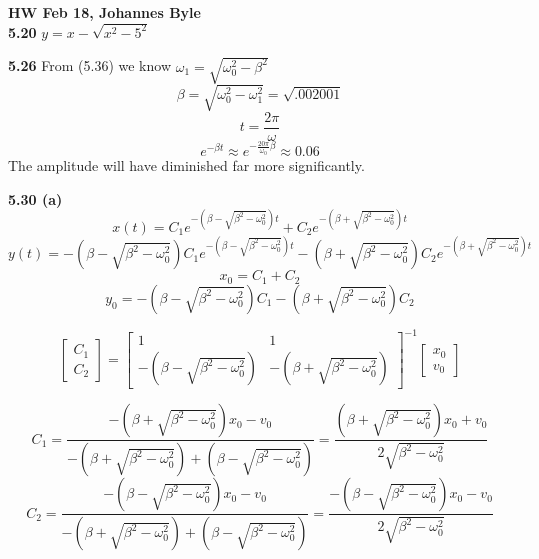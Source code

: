 \documentclass[english]{article}
\begin{document}
\textbf{HW Feb 18, Johannes Byle}\\

\noindent
\textbf{5.20} $y=x-\sqrt{x^2-5^2}$


\noindent
\textbf{5.26} From (5.36) we know $\omega_1=\sqrt{\omega_0^2-\beta^2}$
$$\beta=\sqrt{\omega_0^2-\omega_1^2}=\sqrt{.002001}$$
$$t=\frac{2\pi}{\omega}$$
$$e^{-\beta t}\approx e^{-\frac{20\pi}{\omega_0}\beta}\approx0.06$$
The amplitude will have diminished far more significantly.

\noindent
\textbf{5.30 (a)} $$x(t)=C_1e^{-(\beta-\sqrt{\beta^2-\omega_0^2})t}+C_2e^{-(\beta+\sqrt{\beta^2-\omega_0^2})t}$$
$$y(t)=-(\beta-\sqrt{\beta^2-\omega_0^2})C_1e^{-(\beta-\sqrt{\beta^2-\omega_0^2})t}-(\beta+\sqrt{\beta^2-\omega_0^2})C_2e^{-(\beta+\sqrt{\beta^2-\omega_0^2})t}$$
$$x_0=C_1+C_2$$
$$y_0=-(\beta-\sqrt{\beta^2-\omega_0^2})C_1-(\beta+\sqrt{\beta^2-\omega_0^2})C_2$$

\[
\begin{bmatrix}
C_1 \\
C_2
\end{bmatrix}
=
\begin{bmatrix}
1&1 \\
-(\beta-\sqrt{\beta^2-\omega_0^2})&-(\beta+\sqrt{\beta^2-\omega_0^2})
\end{bmatrix}^{-1}
\begin{bmatrix}
x_0 \\
v_0
\end{bmatrix}
\]

$$C_1=\frac{-(\beta+\sqrt{\beta^2-\omega_0^2})x_0-v_0}{-(\beta+\sqrt{\beta^2-\omega_0^2})+(\beta-\sqrt{\beta^2-\omega_0^2})}=\frac{(\beta+\sqrt{\beta^2-\omega_0^2})x_0+v_0}{2\sqrt{\beta^2-\omega_0^2}}$$
$$C_2=\frac{-(\beta-\sqrt{\beta^2-\omega_0^2})x_0-v_0}{-(\beta+\sqrt{\beta^2-\omega_0^2})+(\beta-\sqrt{\beta^2-\omega_0^2})}=\frac{-(\beta-\sqrt{\beta^2-\omega_0^2})x_0-v_0}{2\sqrt{\beta^2-\omega_0^2}}$$
\end{document}
